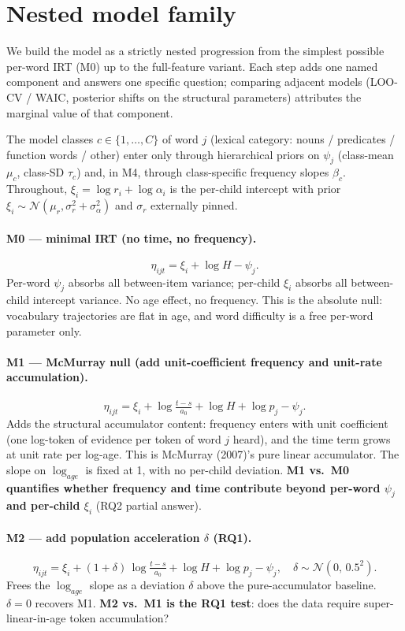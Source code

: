\documentclass[11pt]{article}
\newcommand{\Norm}{\mathcal{N}}
\begin{document}
\section{Nested model family}
\label{sec:nested}

We build the model as a strictly nested progression from the simplest
possible per-word IRT (M0) up to the full-feature variant. Each step
adds one named component and answers one specific question; comparing
adjacent models (LOO-CV / WAIC, posterior shifts on the structural
parameters) attributes the marginal value of that component.

The model classes \(c \in \{1, \ldots, C\}\) of word \(j\) (lexical
category: nouns / predicates / function words / other) enter only
through hierarchical priors on \(\psi_j\) (class-mean \(\mu_c\),
class-SD \(\tau_c\)) and, in M4, through class-specific frequency
slopes \(\beta_c\). Throughout, \(\xi_i = \log r_i + \log \alpha_i\)
is the per-child intercept with prior
\(\xi_i \sim \Norm(\mu_r, \sigma_r^2 + \sigma_\alpha^2)\) and
\(\sigma_r\) externally pinned.

\paragraph{M0 — minimal IRT (no time, no frequency).}
\[
\eta_{ijt} = \xi_i + \log H - \psi_j.
\]
Per-word \(\psi_j\) absorbs all between-item variance; per-child
\(\xi_i\) absorbs all between-child intercept variance.  No age
effect, no frequency. This is the absolute null: vocabulary
trajectories are flat in age, and word difficulty is a free
per-word parameter only.

\paragraph{M1 — McMurray null (add unit-coefficient frequency and
unit-rate accumulation).}
\[
\eta_{ijt} = \xi_i + \log\!\tfrac{t-s}{a_0} + \log H + \log p_j - \psi_j.
\]
Adds the structural accumulator content: frequency enters with unit
coefficient (one log-token of evidence per token of word \(j\)
heard), and the time term grows at unit rate per log-age. This is
McMurray (2007)'s pure linear accumulator. The slope on
\(\log_{age}\) is fixed at 1, with no per-child deviation.
\textbf{M1 vs.\ M0 quantifies whether frequency and time contribute
beyond per-word \(\psi_j\) and per-child \(\xi_i\)} (RQ2 partial answer).

\paragraph{M2 — add population acceleration \(\delta\) (RQ1).}
\[
\eta_{ijt} = \xi_i + (1 + \delta)\,\log\!\tfrac{t-s}{a_0} + \log H + \log p_j - \psi_j,
\quad \delta \sim \Norm(0,\,0.5^2).
\]
Frees the \(\log_{age}\) slope as a deviation \(\delta\) above the
pure-accumulator baseline. \(\delta = 0\) recovers M1.
\textbf{M2 vs.\ M1 is the RQ1 test}: does the data require
super-linear-in-age token accumulation?
\end{document}
